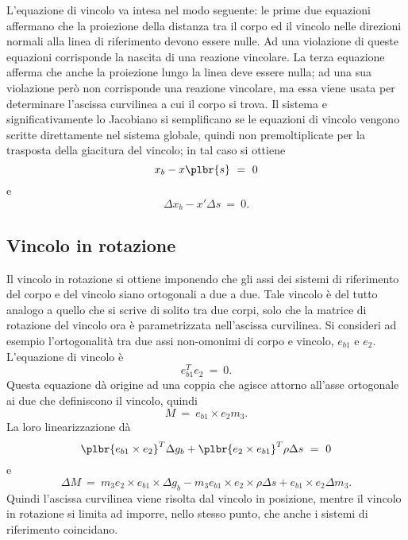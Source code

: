 \documentclass[12pt,dvips,fleqn,italian]{article}
\begin{document}
L'equazione di vincolo va intesa nel modo seguente: le prime due equazioni
affermano che la proiezione della distanza tra il corpo ed il vincolo nelle
direzioni normali alla linea di riferimento devono essere nulle. 
Ad una violazione di queste equazioni corrisponde la nascita di una reazione
vincolare.
La terza equazione afferma che anche la proiezione lungo la linea deve
essere nulla; ad una sua violazione per\`{o} non corrisponde una reazione
vincolare, ma essa viene usata per determinare l'ascissa curvilinea a cui il
corpo si trova.
Il sistema e significativamente lo Jacobiano si semplificano se le equazioni
di vincolo vengono scritte direttamente nel sistema globale, quindi non
premoltiplicate per la trasposta della giacitura del vincolo; in tal caso si
ottiene
\begin{displaymath}
    x_b - x\plbr{s} \ = \ 0
\end{displaymath}
e 
\begin{displaymath}
    \Delta{x_b} - x' \Delta{s} \ = \ 0 .
\end{displaymath}



\subsection*{Vincolo in rotazione}
Il vincolo in rotazione si ottiene imponendo che gli assi dei sistemi di
riferimento del corpo e del vincolo siano ortogonali a due a due.
Tale vincolo \`{e} del tutto analogo a quello che si scrive di solito tra
due corpi, solo che la matrice di rotazione del vincolo ora \`{e}
parametrizzata nell'ascissa curvilinea.
Si consideri ad esempio l'ortogonalit\`{a} tra due assi non-omonimi di corpo
e vincolo, $ e_{b1} $ e $ e_2 $.
L'equazione di vincolo \`{e}
\begin{displaymath}
    e_{b1}^T e_2 \ = \ 0 .
\end{displaymath}
Questa equazione d\`{a} origine ad una coppia che agisce attorno all'asse
ortogonale ai due che definiscono il vincolo, quindi
\begin{displaymath}
    M \ = \ e_{b1} \times e_2 m_3 .
\end{displaymath}
La loro linearizzazione d\`{a}
\begin{displaymath}
    \plbr{ e_{b1} \times e_2 }^T \Delta{g_b}
    +\plbr{ e_2 \times e_{b1} }^T \rho \Delta{s} \ = \ 0
\end{displaymath}
e
\begin{displaymath}
    \Delta{M} \ = \
        m_3 e_2 \times e_{b1} \times \Delta{g_b}
	- m_3 e_{b1} \times e_2 \times \rho \Delta{s}
	+ e_{b1} \times e_2 \Delta{m_3} .
\end{displaymath}
Quindi l'ascissa curvilinea viene risolta dal vincolo in posizione, mentre
il vincolo in rotazione si limita ad imporre, nello stesso punto, che anche
i sistemi di riferimento coincidano.
\end{document}
